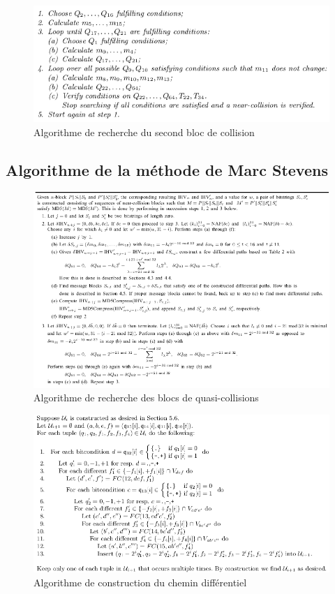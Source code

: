 \documentclass[a4paper,11pt,french]{report}
\begin{document}
\begin{figure}[h!]
  \includegraphics[scale=.61]{./images/sblock.png}
  \caption{Algorithme de recherche du second bloc de collision}
\end{figure}

\newpage
\subsection{Algorithme de la méthode de Marc Stevens}
\begin{figure}[h!]
  \includegraphics[scale=.61]{./images/ncb.png}
  \caption{Algorithme de recherche des blocs de quasi-collisions}
\end{figure}


\begin{figure}[h!]
  \includegraphics[scale=.50]{./images/ui.png}
  \caption{Algorithme de construction du chemin différentiel}
\end{figure}
\end{document}
